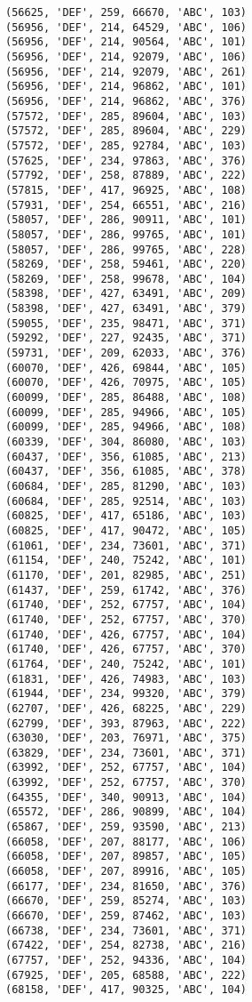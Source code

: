 \begin{verbatim}
(56625, 'DEF', 259, 66670, 'ABC', 103)
(56956, 'DEF', 214, 64529, 'ABC', 106)
(56956, 'DEF', 214, 90564, 'ABC', 101)
(56956, 'DEF', 214, 92079, 'ABC', 106)
(56956, 'DEF', 214, 92079, 'ABC', 261)
(56956, 'DEF', 214, 96862, 'ABC', 101)
(56956, 'DEF', 214, 96862, 'ABC', 376)
(57572, 'DEF', 285, 89604, 'ABC', 103)
(57572, 'DEF', 285, 89604, 'ABC', 229)
(57572, 'DEF', 285, 92784, 'ABC', 103)
(57625, 'DEF', 234, 97863, 'ABC', 376)
(57792, 'DEF', 258, 87889, 'ABC', 222)
(57815, 'DEF', 417, 96925, 'ABC', 108)
(57931, 'DEF', 254, 66551, 'ABC', 216)
(58057, 'DEF', 286, 90911, 'ABC', 101)
(58057, 'DEF', 286, 99765, 'ABC', 101)
(58057, 'DEF', 286, 99765, 'ABC', 228)
(58269, 'DEF', 258, 59461, 'ABC', 220)
(58269, 'DEF', 258, 99678, 'ABC', 104)
(58398, 'DEF', 427, 63491, 'ABC', 209)
(58398, 'DEF', 427, 63491, 'ABC', 379)
(59055, 'DEF', 235, 98471, 'ABC', 371)
(59292, 'DEF', 227, 92435, 'ABC', 371)
(59731, 'DEF', 209, 62033, 'ABC', 376)
(60070, 'DEF', 426, 69844, 'ABC', 105)
(60070, 'DEF', 426, 70975, 'ABC', 105)
(60099, 'DEF', 285, 86488, 'ABC', 108)
(60099, 'DEF', 285, 94966, 'ABC', 105)
(60099, 'DEF', 285, 94966, 'ABC', 108)
(60339, 'DEF', 304, 86080, 'ABC', 103)
(60437, 'DEF', 356, 61085, 'ABC', 213)
(60437, 'DEF', 356, 61085, 'ABC', 378)
(60684, 'DEF', 285, 81290, 'ABC', 103)
(60684, 'DEF', 285, 92514, 'ABC', 103)
(60825, 'DEF', 417, 65186, 'ABC', 103)
(60825, 'DEF', 417, 90472, 'ABC', 105)
(61061, 'DEF', 234, 73601, 'ABC', 371)
(61154, 'DEF', 240, 75242, 'ABC', 101)
(61170, 'DEF', 201, 82985, 'ABC', 251)
(61437, 'DEF', 259, 61742, 'ABC', 376)
(61740, 'DEF', 252, 67757, 'ABC', 104)
(61740, 'DEF', 252, 67757, 'ABC', 370)
(61740, 'DEF', 426, 67757, 'ABC', 104)
(61740, 'DEF', 426, 67757, 'ABC', 370)
(61764, 'DEF', 240, 75242, 'ABC', 101)
(61831, 'DEF', 426, 74983, 'ABC', 103)
(61944, 'DEF', 234, 99320, 'ABC', 379)
(62707, 'DEF', 426, 68225, 'ABC', 229)
(62799, 'DEF', 393, 87963, 'ABC', 222)
(63030, 'DEF', 203, 76971, 'ABC', 375)
(63829, 'DEF', 234, 73601, 'ABC', 371)
(63992, 'DEF', 252, 67757, 'ABC', 104)
(63992, 'DEF', 252, 67757, 'ABC', 370)
(64355, 'DEF', 340, 90913, 'ABC', 104)
(65572, 'DEF', 286, 90899, 'ABC', 104)
(65867, 'DEF', 259, 93590, 'ABC', 213)
(66058, 'DEF', 207, 88177, 'ABC', 106)
(66058, 'DEF', 207, 89857, 'ABC', 105)
(66058, 'DEF', 207, 89916, 'ABC', 105)
(66177, 'DEF', 234, 81650, 'ABC', 376)
(66670, 'DEF', 259, 85274, 'ABC', 103)
(66670, 'DEF', 259, 87462, 'ABC', 103)
(66738, 'DEF', 234, 73601, 'ABC', 371)
(67422, 'DEF', 254, 82738, 'ABC', 216)
(67757, 'DEF', 252, 94336, 'ABC', 104)
(67925, 'DEF', 205, 68588, 'ABC', 222)
(68158, 'DEF', 417, 90325, 'ABC', 104)

\end{verbatim}
